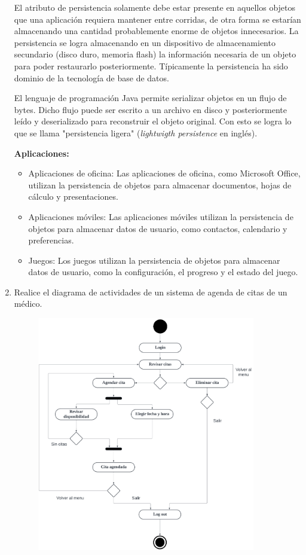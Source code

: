 \documentclass[12pt]{article}
\newcommand{\linejump}{\hfill \break}
\begin{document}
\begin{enumerate}
    El atributo de persistencia solamente debe estar presente en aquellos objetos que una aplicación requiera mantener entre corridas, de otra forma se estarían almacenando una cantidad probablemente enorme de objetos innecesarios. La persistencia se logra almacenando en un dispositivo de almacenamiento secundario (disco duro, memoria flash) la información necesaria de un objeto para poder restaurarlo posteriormente. Típicamente la persistencia ha sido dominio de la tecnología de base de datos.

    El lenguaje de programación Java permite serializar objetos en un flujo de bytes. Dicho flujo puede ser escrito a un archivo en disco y posteriormente leído y deserializado para reconstruir el objeto original. Con esto se logra lo que se llama "persistencia ligera" (\textit{lightwigth persistence} en inglés). 

    \textbf{Aplicaciones:}
    \begin{itemize}
      \item Aplicaciones de oficina: Las aplicaciones de oficina, como Microsoft Office, utilizan la persistencia de objetos para almacenar documentos, hojas de cálculo y presentaciones.
      \item Aplicaciones móviles: Las aplicaciones móviles utilizan la persistencia de objetos para almacenar datos de usuario, como contactos, calendario y preferencias.
      \item Juegos: Los juegos utilizan la persistencia de objetos para almacenar datos de usuario, como la configuración, el progreso y el estado del juego.
    \end{itemize}
  
    \newpage
    \item Realice el diagrama de actividades de un sistema de agenda de citas de un médico.
    
    \linejump
    \begin{figure}[ht]
      \includegraphics[width = 0.9\textwidth, center]{actividades.png}
    \end{figure}
    

\end{enumerate}
\end{document}

